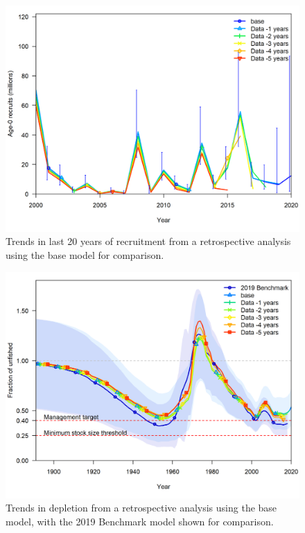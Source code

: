 \documentclass[11pt,
  english,
  a4paper,
]{article}
\begin{document}
\tagmcend\tagstructend


\begin{figure}
\centering
\includegraphics[width=1\textwidth,height=0.5\textheight]{figs/retro_base_rec.png}
\caption{Trends in last 20 years of recruitment from a retrospective analysis using the base model for comparison.\label{fig:retroREC}}
\end{figure}

\tagmcend\tagstructend


\begin{figure}
\centering
\includegraphics[width=1\textwidth,height=0.5\textheight]{figs/retro_bench_depl.png}
\caption{Trends in depletion from a retrospective analysis using the base model, with the 2019 Benchmark model shown for comparison.\label{fig:retrobenchDEP}}
\end{figure}
\end{document}
